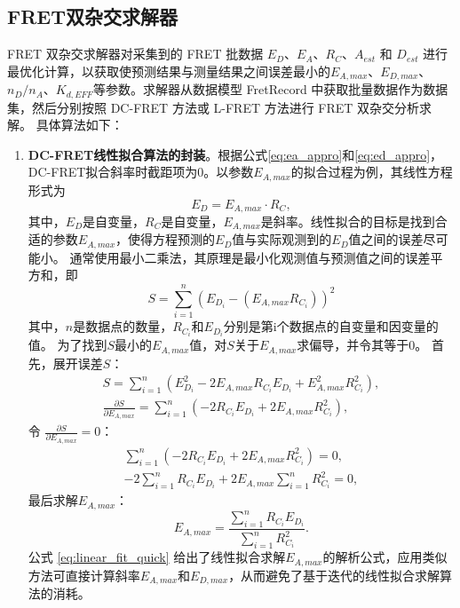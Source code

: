 \subsection{FRET双杂交求解器}
FRET 双杂交求解器对采集到的 FRET 批数据 $E_D$、$E_A$、$R_C$、$A_{est}$ 和 $D_{est}$ 进行最优化计算，以获取使预测结果与测量结果之间误差最小的$E_{A,max}$、$E_{D,max}$、$n_D / n_A$、$K_{d,EFF}$等参数。求解器从数据模型 FretRecord 中获取批量数据作为数据集，然后分别按照 DC-FRET 方法或 L-FRET 方法进行 FRET 双杂交分析求解。
具体算法如下：
\begin{enumerate}
  \item \textbf{DC-FRET线性拟合算法的封装}。根据公式\ref{eq:ea_appro}和\ref{eq:ed_appro}，DC-FRET拟合斜率时截距项为0。以参数$E_{A,max}$的拟合过程为例，其线性方程形式为
  \begin{equation}
      E_D = E_{A,max}\cdot R_C,
  \end{equation}
  其中，$E_D$是自变量，$R_C$是自变量，$E_{A,max}$是斜率。线性拟合的目标是找到合适的参数$E_{A,max}$，使得方程预测的$E_D$值与实际观测到的$E_D$值之间的误差尽可能小。
  通常使用最小二乘法，其原理是最小化观测值与预测值之间的误差平方和，即
  \begin{equation}
      S=\sum^{n}_{i=1}(E_{D_i}-(E_{A,max}R_{C_i}))^2
  \end{equation}
  其中，$n$是数据点的数量，$R_{C_i}$和$E_{D_i}$分别是第i个数据点的自变量和因变量的值。
  为了找到$S$最小的$E_{A,max}$值，对$S$关于$E_{A,max}$求偏导，并令其等于0。
  首先，展开误差$S$：
  \begin{align}
       S=\sum_{i = 1}^{n}(E_{D_i}^{2}-2E_{A,max}R_{C_i}E_{D_i} + E_{A,max}^{2}R_{C_i}^{2}), \\
       \frac{\partial S}{\partial E_{A,max}}=\sum_{i = 1}^{n}(-2R_{C_i}E_{D_i} + 2E_{A,max}R_{C_i}^{2}),
  \end{align}
  令 \(\frac{\partial S}{\partial E_{A,max}}=0\)：
  \begin{align}
       \sum_{i = 1}^{n}(-2R_{C_i}E_{D_i} + 2E_{A,max}R_{C_i}^{2}) = 0, \\
      -2\sum_{i = 1}^{n}R_{C_i}E_{D_i}+2E_{A,max}\sum_{i = 1}^{n}R_{C_i}^{2}=0,
  \end{align}
  最后求解$E_{A,max}$：
  \begin{equation}
         E_{A,max}=\frac{\sum_{i = 1}^{n}R_{C_i}E_{D_i}}{\sum_{i = 1}^{n}R_{C_i}^{2}}. \label{eq:linear_fit_quick}
  \end{equation}
  公式 \ref{eq:linear_fit_quick} 给出了线性拟合求解$E_{A,max}$的解析公式，应用类似方法可直接计算斜率$E_{A,max}$和$E_{D,max}$，从而避免了基于迭代的线性拟合求解算法的消耗。


\end{enumerate}
